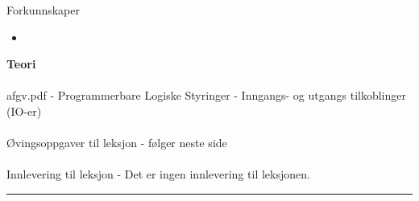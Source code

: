 	Forkunnskaper

	\begin{itemize}[noitemsep]
		\item 

	\end{itemize}
\textbf{Teori}\\\\
afgv.pdf - Programmerbare Logiske Styringer - Inngangs- og utgangs tilkoblinger (IO-er)\\\\
Øvingsoppgaver til leksjon - følger neste side\\\\
Innlevering til leksjon - Det er ingen innlevering til leksjonen. 
\bigskip 
\hrule
\vfil \eject

